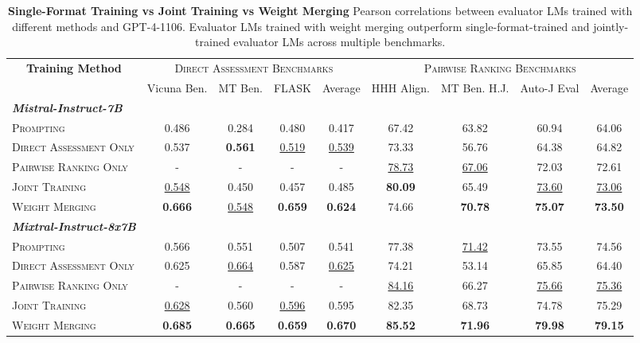 \documentclass[11pt]{article}
\begin{document}
\begin{table}[t!]
\centering
\fontsize{7}{10}\selectfont
\begin{tabular}{lcccccccc}
    \toprule
     \multicolumn{1}{c}{\multirow{2}{*}{\textbf{Training Method}}}&\multicolumn{4}{c}{\textsc{Direct Assessment Benchmarks}} & \multicolumn{4}{c}{\textsc{Pairwise Ranking Benchmarks}}\\ 
    \cmidrule(lr){2-5} \cmidrule(lr){6-9} & Vicuna Ben. & MT Ben. & FLASK & Average & HHH Align. & MT Ben. H.J. & Auto-J Eval & Average\\
    \midrule
    \textit{\textbf{Mistral-Instruct-7B}}\\
    \midrule
    \textsc{Prompting} & 0.486 & 0.284 & 0.480 & 0.417 &67.42&63.82&60.94&64.06\\
    \textsc{Direct Assessment Only} & 0.537 & \textbf{0.561} & \underline{0.519}  & \underline{0.539} & 73.33 & 56.76 & 64.38&64.82\\
    \textsc{Pairwise Ranking Only} & - & - & - & - & \underline{78.73} & \underline{67.06} & 72.03&72.61\\
    \textsc{Joint Training} & \underline{0.548} & 0.450 & 0.457 & 0.485 & \textbf{80.09} & 65.49 & \underline{73.60}&\underline{73.06}\\
    \textsc{Weight Merging} & \textbf{0.666} & \underline{0.548} & \textbf{0.659} & \textbf{0.624} & 74.66 & \textbf{70.78} & \textbf{75.07}&\textbf{73.50} \\
    \midrule
    \textit{\textbf{Mixtral-Instruct-8x7B}}\\
    \midrule
    \textsc{Prompting} & 0.566 & 0.551 & 0.507 & 0.541 & 77.38 & \underline{71.42} & 73.55 & 74.56\\
    \textsc{Direct Assessment Only} & 0.625 & \underline{0.664} & 0.587 & \underline{0.625} & 74.21 & 53.14 & 65.85 & 64.40\\
    \textsc{Pairwise Ranking Only} & - & - & - & - & \underline{84.16} & 66.27 & \underline{75.66}&\underline{75.36}\\
    \textsc{Joint Training} & \underline{0.628} & 0.560 & \underline{0.596} & 0.595 & 82.35 & 68.73 & 74.78&75.29\\
    \textsc{Weight Merging} & \textbf{0.685} & \textbf{0.665} & \textbf{0.659} & \textbf{0.670}& \textbf{85.52} & \textbf{71.96} & \textbf{79.98} &\textbf{79.15}\\
    \bottomrule    
\end{tabular}
\caption{\footnotesize \textbf{Single-Format Training vs Joint Training vs Weight Merging} Pearson correlations between evaluator LMs trained with different methods and GPT-4-1106. Evaluator LMs trained with weight merging outperform single-format-trained and jointly-trained evaluator LMs across multiple benchmarks.}
\label{table:merging_multitask}
\end{table}  
\end{document}

